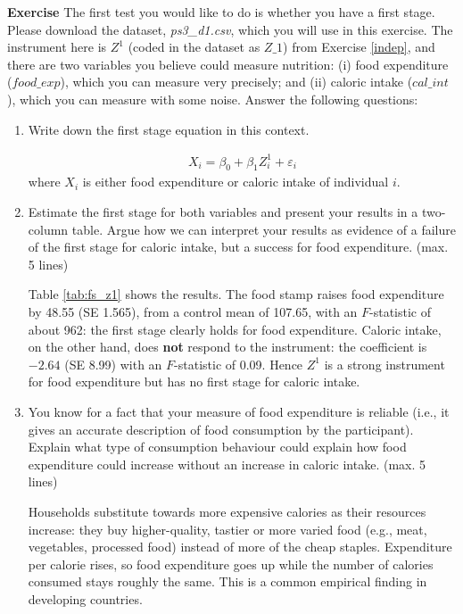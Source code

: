\documentclass[10pt]{article}
\newcounter{exercise}
\newenvironment{exercise}%
{%
	\refstepcounter{exercise}%
	\textbf{Exercise \theexercise}%
	}%
{
 \par\vspace{\baselineskip}%
\noindent\ignorespacesafterend
}
\begin{document}
\begin{exercise}\label{substitution}
	The first test you would like to do is whether you have a first stage. Please download the dataset, \textit{ps3\_d1.csv}, which you will use in this exercise. The instrument here is $ Z^1 $ (coded in the dataset as $ Z\_1 $) from Exercise \ref{indep}, and there are two variables you believe could measure nutrition: (i) food expenditure ($ food\_exp $), which you can measure very precisely; and (ii) caloric intake ($ cal\_int $), which you can measure with some noise. Answer the following questions:
	\begin{enumerate}
		\item Write down the first stage equation in this context.

		\color{red}
		\begin{align*}
		X_i = \beta_{0} + \beta_{1}Z^1_i + \varepsilon_{i}
		\end{align*}
		where $ X_i $ is either food expenditure or caloric intake of individual $ i $.
		\color{black}
		\item Estimate the first stage for both variables and present your results in a two-column table. Argue how we can interpret your results as evidence of a failure of the first stage for caloric intake, but a success for food expenditure. (max. 5 lines)

		\color{red}
		Table \ref{tab:fs_z1} shows the results. The food stamp raises food expenditure by 48.55 (SE 1.565), from a control mean of 107.65, with an $F$-statistic of about 962: the first stage clearly holds for food expenditure. Caloric intake, on the other hand, does \textbf{not} respond to the instrument: the coefficient is $-2.64$ (SE 8.99) with an $F$-statistic of 0.09. Hence $ Z^1 $ is a strong instrument for food expenditure but has no first stage for caloric intake.

		
		\color{black}
		\item You know for a fact that your measure of food expenditure is reliable (i.e., it gives an accurate description of food consumption by the participant). Explain what type of consumption behaviour could explain how food expenditure could increase without an increase in caloric intake. (max. 5 lines)

		\color{red}
		Households substitute towards more expensive calories as their resources increase: they buy higher-quality, tastier or more varied food (e.g., meat, vegetables, processed food) instead of more of the cheap staples. Expenditure per calorie rises, so food expenditure goes up while the number of calories consumed stays roughly the same. This is a common empirical finding in developing countries.
		\color{black}
	\end{enumerate}
\end{exercise}
\end{document}
